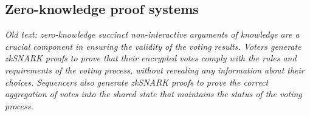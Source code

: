 \subsection{Zero-knowledge proof systems}
\label{sec:cryptographic-primitives:zkp}

\textit{Old text: zero-knowledge succinct non-interactive arguments of knowledge are a crucial component in ensuring the validity of the voting results. Voters generate zkSNARK proofs to prove that their encrypted votes comply with the rules and requirements of the voting process, without revealing any information about their choices. Sequencers also generate zkSNARK proofs to prove the correct aggregation of votes into the shared state that maintains the status of the voting process.}